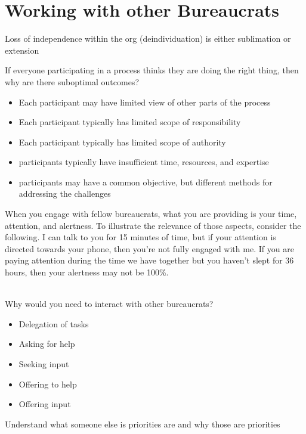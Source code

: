 \section{Working with other Bureaucrats\label{sec:working-with-other-bureaucrats}}


Loss of independence within the org (deindividuation) is either sublimation or extension 

If everyone participating in a process thinks they are doing the right thing, then why are there suboptimal outcomes?
\begin{itemize}
    \item Each participant may have limited view of other parts of the process
    \item Each participant typically has limited scope of responsibility
    \item Each participant typically has limited scope of authority
    \item participants typically have insufficient time, resources, and expertise
    \item participants may have a common objective, but different methods for addressing the challenges
\end{itemize}


When you engage with fellow bureaucrats, what you are providing is your time, attention, and alertness. To illustrate the relevance of those aspects, consider the following. I can talk to you for 15 minutes of time, but if your attention is directed towards your phone, then you're not fully engaged with me. If you are paying attention during the time we have together but you haven't slept for 36 hours, then your alertness may not be 100\%. 

\ \\

Why would you need to interact with other bureaucrats?
\begin{itemize}
    \item Delegation of tasks
    \item Asking for help
    \item Seeking input
    \item Offering to help
    \item Offering input
\end{itemize}

Understand what someone else is priorities are and why those are priorities

